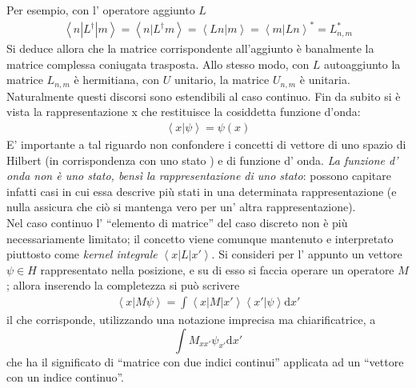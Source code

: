 Per esempio, con l' operatore aggiunto $L$
 \begin{equation}\begin{split}
\left\langle n|L^{\dag}|m \right\rangle=\left\langle n|L^{\dag}m\right\rangle=\left\langle Ln|m \right\rangle=\left\langle m|Ln \right\rangle^*=L^*_{n,m}
 \end{split}\end{equation}
Si deduce allora che la matrice corrispondente all'aggiunto è banalmente la matrice complessa coniugata trasposta.
Allo stesso modo, con $L$ autoaggiunto la matrice $L_{n,m}$ è hermitiana, con $U$ unitario, la matrice  $U_{n,m}$ è unitaria.\\
Naturalmente questi discorsi sono estendibili al caso continuo.
Fin da subito si è vista la rappresentazione x che restituisce la cosiddetta funzione d'onda:
 \begin{equation}\begin{split}
\left\langle x|\psi  \right\rangle=\psi \left(x\right)
 \end{split}\end{equation}
E' importante a tal riguardo non confondere i concetti di vettore di uno spazio di Hilbert (in corrispondenza con uno stato ) e di funzione d' onda.\textit{ La funzione d' onda  non è uno stato, bensì la rappresentazione di uno stato}: possono capitare infatti casi in cui essa descrive più stati in una determinata rappresentazione (e nulla assicura che ciò si mantenga vero per un' altra rappresentazione).\\
Nel caso continuo l' ``elemento di matrice'' del caso discreto non è più necessariamente limitato; il concetto viene comunque mantenuto e interpretato piuttosto come \textit{kernel integrale} $\left\langle x|L|x' \right\rangle$.
Si consideri per l' appunto un vettore $\psi\in H$ rappresentato nella posizione, e su di esso si faccia operare un operatore $M$; allora inserendo la completezza si può scrivere
 \begin{equation}\begin{split}
\left\langle x|M\psi  \right\rangle=\int{\left\langle x|M|x' \right\rangle\left\langle x'|\psi  \right\rangle \textrm{d}x'}
 \end{split}\end{equation}
il che corrisponde, utilizzando una notazione imprecisa ma chiarificatrice, a 
 \begin{equation}
\int{M_{xx'}\psi _{x'}\textrm{d}x'}
 \end{equation}
che ha il significato di ``matrice con due indici continui'' applicata ad un ``vettore con un indice continuo''.\\
